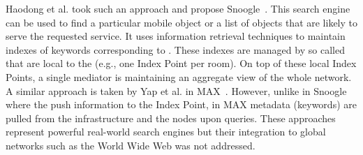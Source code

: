Haodong et al. took such an approach and propose Snoogle~\cite{HaodongWang2010}. This search engine can be used to find a particular mobile object or a list of objects that are likely to serve the requested service. It uses information retrieval techniques to maintain indexes of keywords corresponding to \sts{}. These indexes are managed by so called  that are local to the \sts{} (e.g., one Index Point per room). On top of these local Index Points, a single mediator is maintaining an aggregate view of the whole network. A similar approach is taken by Yap et al. in MAX~\cite{Yap2005}. However, unlike in Snoogle where the \sts{} push information to the Index Point, in MAX metadata (keywords) are pulled from the infrastructure and the nodes upon queries. These approaches represent powerful real-world search engines but their integration to global networks such as the World Wide Web was not addressed.

